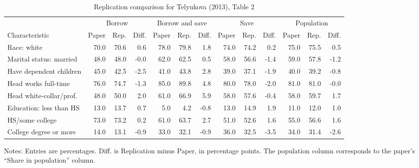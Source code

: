 \documentclass[11pt]{article}
\begin{document}
\begin{table}[!htbp]
	\centering
	\begin{threeparttable}
		\caption{Replication comparison for Telyukova (2013), Table 2}
		\label{tab:telyukova_table2_replication_comparison}
		\begingroup
		\scriptsize
		\setlength{\tabcolsep}{2.5pt}
		\begin{tabular}{lrrrrrrrrrrrr}
			\toprule
			& \multicolumn{3}{c}{Borrow} & \multicolumn{3}{c}{Borrow and save} & \multicolumn{3}{c}{Save} & \multicolumn{3}{c}{Population} \\
			\cmidrule(lr){2-4} \cmidrule(lr){5-7} \cmidrule(lr){8-10} \cmidrule(lr){11-13}
			Characteristic & Paper & Rep. & Diff. & Paper & Rep. & Diff. & Paper & Rep. & Diff. & Paper & Rep. & Diff. \\
			\midrule
			Race: white & 70.0 & 70.6 & 0.6 & 78.0 & 79.8 & 1.8 & 74.0 & 74.2 & 0.2 & 75.0 & 75.5 & 0.5 \\
			Marital status: married & 48.0 & 48.0 & -0.0 & 62.0 & 62.5 & 0.5 & 58.0 & 56.6 & -1.4 & 59.0 & 57.8 & -1.2 \\
			Have dependent children & 45.0 & 42.5 & -2.5 & 41.0 & 43.8 & 2.8 & 39.0 & 37.1 & -1.9 & 40.0 & 39.2 & -0.8 \\
			Head works full-time & 76.0 & 74.7 & -1.3 & 85.0 & 89.8 & 4.8 & 80.0 & 78.0 & -2.0 & 81.0 & 81.0 & -0.0 \\
			Head white-collar/prof. & 48.0 & 50.0 & 2.0 & 61.0 & 66.9 & 5.9 & 58.0 & 57.6 & -0.4 & 58.0 & 59.7 & 1.7 \\
			Education: less than HS & 13.0 & 13.7 & 0.7 & 5.0 & 4.2 & -0.8 & 13.0 & 14.9 & 1.9 & 11.0 & 12.0 & 1.0 \\
			HS/some college & 73.0 & 73.2 & 0.2 & 61.0 & 63.7 & 2.7 & 51.0 & 52.6 & 1.6 & 55.0 & 56.6 & 1.6 \\
			College degree or more & 14.0 & 13.1 & -0.9 & 33.0 & 32.1 & -0.9 & 36.0 & 32.5 & -3.5 & 34.0 & 31.4 & -2.6 \\
			\bottomrule
		\end{tabular}
		\endgroup
		\begin{tablenotes}[flushleft]
			\footnotesize
			\item Notes: Entries are percentages. Diff. is Replication minus Paper, in percentage points. The population column corresponds to the paper's ``Share in population'' column.
		\end{tablenotes}
	\end{threeparttable}
\end{table}
\end{document}
